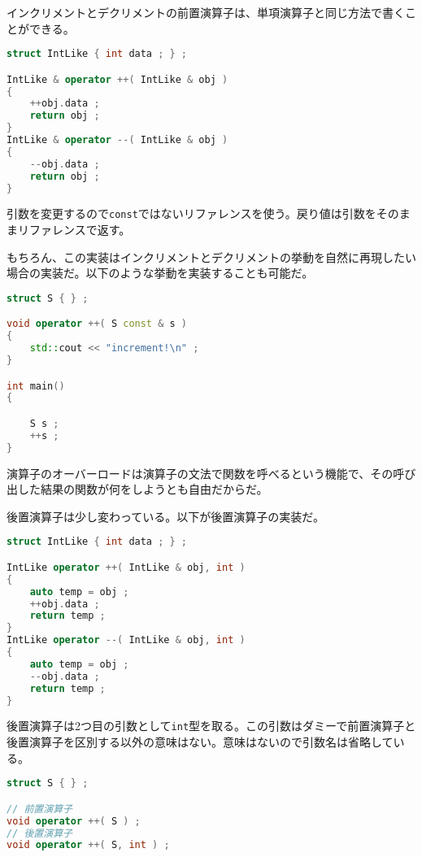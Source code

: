 インクリメントとデクリメントの前置演算子は、単項演算子と同じ方法で書くことができる。

\begin{lstlisting}[language={C++}]
struct IntLike { int data ; } ;

IntLike & operator ++( IntLike & obj )
{
    ++obj.data ;
    return obj ;
}
IntLike & operator --( IntLike & obj )
{
    --obj.data ;
    return obj ;
}
\end{lstlisting}

引数を変更するので\texttt{const}ではないリファレンスを使う。戻り値は引数をそのままリファレンスで返す。

もちろん、この実装はインクリメントとデクリメントの挙動を自然に再現したい場合の実装だ。以下のような挙動を実装することも可能だ。

\begin{lstlisting}[language={C++}]
struct S { } ;

void operator ++( S const & s )
{
    std::cout << "increment!\n" ;
}

int main()
{

    S s ;
    ++s ;
}
\end{lstlisting}

演算子のオーバーロードは演算子の文法で関数を呼べるという機能で、その呼び出した結果の関数が何をしようとも自由だからだ。

後置演算子は少し変わっている。以下が後置演算子の実装だ。

\begin{lstlisting}[language={C++}]
struct IntLike { int data ; } ;

IntLike operator ++( IntLike & obj, int )
{
    auto temp = obj ;
    ++obj.data ;
    return temp ;
}
IntLike operator --( IntLike & obj, int )
{
    auto temp = obj ;
    --obj.data ;
    return temp ;
}
\end{lstlisting}

後置演算子は2つ目の引数として\texttt{int}型を取る。この引数はダミーで前置演算子と後置演算子を区別する以外の意味はない。意味はないので引数名は省略している。

\begin{lstlisting}[language={C++}]
struct S { } ;

// 前置演算子
void operator ++( S ) ;
// 後置演算子
void operator ++( S, int ) ;
\end{lstlisting}

